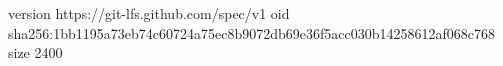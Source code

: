 version https://git-lfs.github.com/spec/v1
oid sha256:1bb1195a73eb74c60724a75ec8b9072db69e36f5acc030b14258612af068c768
size 2400
